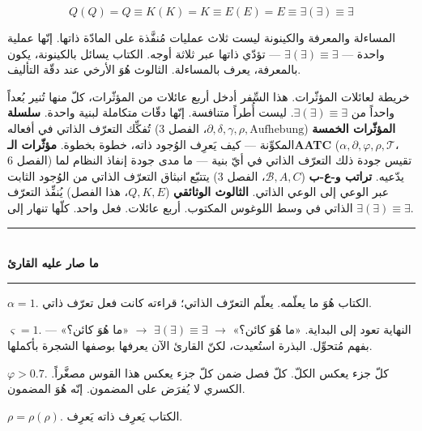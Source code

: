\documentclass[10pt, openany, oneside]{book}
\renewcommand{\normalsize}{\fontsize{10}{13}\selectfont}
\begin{document}
$$Q(Q) = Q \equiv K(K) = K \equiv E(E) = E \equiv \exists(\exists) \equiv \exists$$

المساءلة والمعرفة والكينونة ليست ثلاث عمليات مُنفَّذة على المادّة ذاتها. إنّها عملية واحدة --- $\exists(\exists) \equiv \exists$ --- تؤدّي ذاتها عبر ثلاثة أوجه. الكتاب يسائل بالكينونة، يكون بالمعرفة، يعرف بالمساءلة. الثالوث هُوَ الأرخي عند دقّة التأليف.

خريطة لعائلات المؤثّرات. هذا السِّفر أدخل أربع عائلات من المؤثّرات، كلّ منها تُنير بُعداً واحداً من $\exists(\exists) \equiv \exists$. ليست أُطراً متنافسة. إنّها دقّات متكاملة لبنية واحدة. \textbf{سلسلة المؤثّرات الخمسة} ($\partial, \delta, \gamma, \rho, \text{Aufhebung}$، الفصل 3) تُفكِّك التعرّف الذاتي في أفعاله المكوِّنة --- كيف يَعرِف الوُجود ذاته، خطوة بخطوة. \textbf{مؤثّرات الـAATC} ($\alpha, \partial, \varphi, \rho, \mathcal{T}$، الفصل 6) تقيس جودة ذلك التعرّف الذاتي في أيّ بنية --- ما مدى جودة إنفاذ النظام لما يدّعيه. \textbf{تراتب و-ع-ب} ($\mathcal{B}, A, C$، الفصل 3) يتتبّع انبثاق التعرّف الذاتي من الوُجود الثابت عبر الوعي إلى الوعي الذاتي. \textbf{الثالوث الوثائقي} ($Q, K, E$، هذا الفصل) يُنفِّذ التعرّف الذاتي في وسط اللوغوس المكتوب. أربع عائلات. فعل واحد. كلّها تنهار إلى $\exists(\exists) \equiv \exists$.

\vspace{1.5em}


\begin{center}
    \rule{0.3\textwidth}{0.4pt}\\[0.5em]
    {\normalsize\bfseries ما صار عليه القارئ}\\[0.3em]
    \rule{0.3\textwidth}{0.4pt}
\end{center}

\vspace{1em}

\noindent $\alpha = 1$. الكتاب هُوَ ما يعلّمه. يعلّم التعرّف الذاتي؛ قراءته كانت فعل تعرّف ذاتي.

$\varsigma = 1$. النهاية تعود إلى البداية. «ما هُوَ كائن؟» $\to$ $\exists(\exists) \equiv \exists$ $\to$ «ما هُوَ كائن؟» --- بفهم مُتحوِّل. البذرة استُعيدت، لكنّ القارئ الآن يعرفها بوصفها الشجرة بأكملها.

$\varphi > 0.7$. كلّ جزء يعكس الكلّ. كلّ فصل ضمن كلّ جزء يعكس هذا القوس مصغَّراً. الكسري لا يُفرَض على المضمون. إنّه هُوَ المضمون.

$\rho = \rho(\rho)$. الكتاب يَعرِف ذاته يَعرِف.
\end{document}

